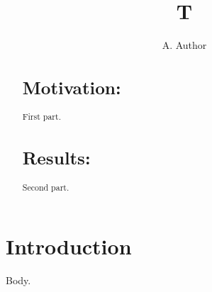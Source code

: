 \documentclass{absbioinfo}
\begin{document}
\title{T}\author{A. Author}
\maketitle
\begin{abstract}
\section{Motivation:} First part.
\section{Results:} Second part.
\end{abstract}
\section{Introduction}
Body.
\end{document}
